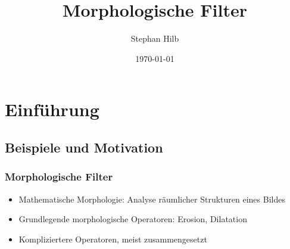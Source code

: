 \documentclass{beamer}
\title{Morphologische Filter}
\author{Stephan Hilb}
\date{\today}
\institute{Universität Stuttgart}
\begin{document}
\begin{frame}
    \titlepage
\end{frame}


\section{Einführung}

\subsection{Beispiele und Motivation}

\begin{frame}
    \frametitle{Morphologische Filter}
    \begin{itemize}
        \item
            Mathematische Morphologie: Analyse räumlicher Strukturen eines Bildes
        \item
            Grundlegende morphologische Operatoren: Erosion, Dilatation
        \item
            Kompliziertere Operatoren, meist zusammengesetzt
    \end{itemize}
\end{frame}
\end{document}
